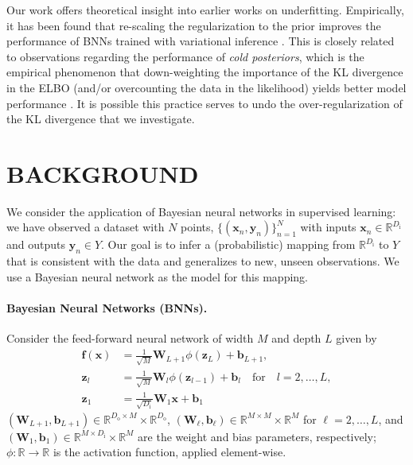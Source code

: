 \documentclass[twoside]{article}
\renewcommand{\ss}[1]{_{\text{#1}}}
\newcommand{\vb}{\mathbf{b}}
\newcommand{\vf}{\mathbf{f}}
\newcommand{\vx}{\mathbf{x}}
\newcommand{\vy}{\mathbf{y}}
\newcommand{\vz}{\mathbf{z}}
\newcommand{\vsigma}{\bm{\upsigma}}
\newcommand{\mW}{\mathbf{W}}
\newcommand{\Q}{\mathbb{Q}}
\renewcommand{\Q}{\ensuremath{Q}}
\newcommand{\R}{\mathbb{R}}
\newcommand{\opspace}{}
\let\sup\relax\DeclareMathOperator*{\sup}{sup\opspace}
\renewcommand{\ss}[1]{_{\text{#1}}}        %
\theoremstyle{theoremstyle}
\begin{document}
Our work offers theoretical insight into earlier works on underfitting. %
Empirically, it has been found that re-scaling the regularization to the prior improves the performance of BNNs trained with variational inference \citep{Osawa:2019:Practical_Deep_Learning_With_Bayesian}. This is closely related to observations regarding the performance of \textit{cold posteriors}, which is the empirical phenomenon that down-weighting the importance of the KL divergence in the ELBO (and/or overcounting the data in the likelihood) yields better model performance \citep{wenzel_2020}. It is possible this practice serves to undo the over-regularization of the KL divergence that we investigate. 



\section{BACKGROUND}\label{sec:background}

We consider the application of Bayesian neural networks in supervised learning: we have observed a dataset with $N$ points, $\{(\vx_n,\vy_n)\}_{n=1}^N$ with inputs $\vx_n \in \R^{D\ss{i}}$ and outputs $\vy_n \in Y$. Our goal is to infer a (probabilistic) mapping from $\R^{D\ss{i}}$ to $Y$ that is consistent with the data and generalizes to new, unseen observations. We use a Bayesian neural network as the model for this mapping.

\paragraph{Bayesian Neural Networks (BNNs).}
Consider the feed-forward neural network of width $M$ and depth $L$ given by
\begin{align}
	\vf(\vx) &= \tfrac{1}{\sqrt{M}}\mW_{L+1} \phi(\vz_{L}) + \vb_{L+1}, \label{eqn:nn-output}\\
	\vz_{l} &= \tfrac{1}{\sqrt{M}}\mW_{l} \phi(\vz_{l - 1}) + \vb_{l} \quad \text{for} \quad \text{$l = 2, \ldots, L$}, \label{eqn:nn-recursion}\\
	\vz_{1} &= \tfrac{1}{\sqrt{D\ss{i}}}\mW_{1} \vx + \vb_{1}\label{eqn:nn-base}
\end{align}
$(\mW_{L+1}, \vb_{L+1}) \in \R^{D\ss{o} \times M} \times \R^{D\ss{o}}$,
$(\mW_\ell, \vb_\ell) \in \R^{M \times M} \times \R^M$ for $\ell = 2, \ldots, L$, and $(\mW_1, \vb_1) \in \R^{M \times D\ss{i}} \times \R^M$ are the weight and bias parameters, respectively; $\phi\colon \R\to\R$ is the activation function, applied element-wise.  
\end{document}
